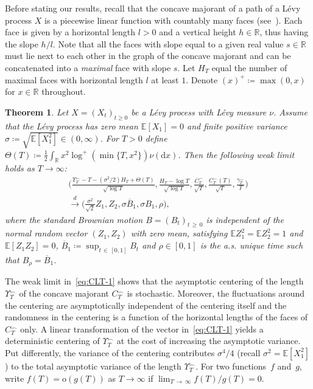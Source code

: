 \documentclass[10pt]{amsart}
\newtheorem{theo}{Theorem}[section]
\theoremstyle{definition}\newtheorem{defi}[theo]{Definition}\newtheorem{rema}[theo]{Remark}\newtheorem{exam}[theo]{Example}\newtheorem{exem}[theo]{Example}\newtheorem{nota}[theo]{Notation}
\newcommand\R{\mathbb{R}}
\newcommand\E{\mathds{E}}
\newcommand\1{\mathds{1}}
\newcommand\D{\mathrm{d}}
\newcommand\oh{\mathrm{o}}
\newcommand\cid{\xrightarrow{d}}
\newcommand\ov[1]{\overline{#1}}
\begin{document}
Before stating our results, recall that the concave majorant of a path of a Lévy process $X$ is a piecewise linear function with countably many faces (see~\cite[Theorem~11]{CM_Fluctuation_Levy}). Each face is given by a horizontal length $l>0$ and a vertical height $h\in\R$, thus having the slope $h/l$. Note that all the faces with slope equal to a given real value $s\in\R$ must lie next to each other in the graph of the concave majorant and can be concatenated into a \emph{maximal} face with slope $s$. Let $H_T$ equal the number of maximal faces with horizontal length $l$ at least $1$. Denote $(x)^+\coloneqq\max(0,x)$ for $x\in\R$ throughout.



\begin{theo}\label{thm:maintheorem1}
Let $X=(X_t)_{t\ge 0}$ be a Lévy process with Lévy measure $\nu$. Assume that the Lévy process has zero mean $\E [X_1]=0$ and finite positive variance $\sigma\coloneqq\sqrt{\E[X_1^2]}\in(0,\infty)$. For $T>0$ define $\Theta(T)\coloneqq \frac{1}{2}
\int_\R x^2\log^+(\min\{T,x^2\})\nu(\D x)$. Then the following weak limit holds as $T\to\infty$:
\begin{equation}\label{eq:CLT-1}
\begin{multlined}
\bigg(
\frac{\Upsilon_T^{\frown} -T-\left(\sigma^2/2\right)H_T +\Theta(T)}{\sqrt{\log T}},
\frac{H_T-\log T}{\sqrt{\log T}},
\frac{\ov{C}^\frown_T}{\sqrt{T}},
\frac{C^\frown_T(T)}{\sqrt{T}},
\frac{\gamma^\frown_T}{T}
\bigg)\\
\cid
\Big(
\tfrac{\sigma^2}{\sqrt{2}}Z_1, Z_2,
\sigma\ov B_1,
\sigma B_1,
\rho
\Big),
\end{multlined}
\end{equation}
where the standard Brownian motion $B=(B_t)_{t\,\geq\,0}$ is independent of the normal random vector $(Z_1,Z_2)$ with zero mean, satisfying $\E Z_1^2=\E Z_2^2=1$ and $\E [Z_1Z_2]=0$, $\ov B_1\coloneqq\sup_{t\,\in\,[0,1]}B_t$ and $\rho\in[0,1]$ is the a.s. unique time such that $B_\rho=\ov B_1$.
\end{theo}


The weak limit in~\eqref{eq:CLT-1} shows that the asymptotic centering of the length $\Upsilon_T^\frown$ of the concave majorant $C^\frown_T$ is stochastic. Moreover, the fluctuations around the centering are asymptotically independent of the centering itself and the randomness in the centering is a function of the horizontal lengths of the faces of $C^\frown_T$ only. A linear transformation of the vector in~\eqref{eq:CLT-1} yields a deterministic centering of $\Upsilon_T^\frown$ at the cost of increasing the asymptotic variance. Put differently, the variance of the centering contributes $\sigma^4/4$ (recall $\sigma^2=\E [X_1^2]$) to the total asymptotic variance of the length $\Upsilon_T^\frown$. For two functions~$f$ and~$g$, write $f(T)=\oh(g(T))$ as $T\to\infty$ if $\lim_{T\,\to\,\infty}f(T)/g(T)=0$.
\end{document}
